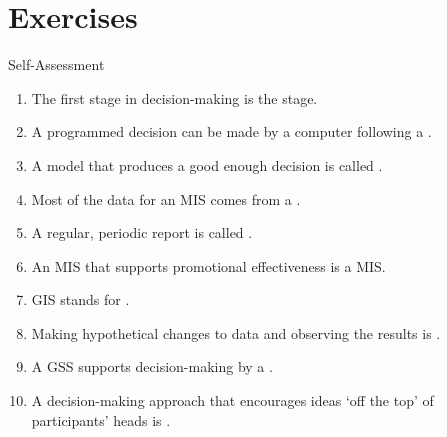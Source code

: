 \documentclass[\main/notes.tex]{subfiles}
\begin{document}
		\pagebreak
		\section{Exercises}
			\begin{exercise}{Self-Assessment}
				\begin{enumerate}[nosep]
					\item The first stage in decision-making is the  stage.
					\item A programmed decision can be made by a computer following a .
					\item A model that produces a good enough decision is called .
					\item Most of the data for an MIS comes from a .
					\item A regular, periodic report is called .
					\item An MIS that supports promotional effectiveness is a  MIS.
					\item GIS stands for .
					\item Making hypothetical changes to data and observing the results is .
					\item A GSS supports decision-making by a .
					\item A decision-making approach that encourages ideas `off the top' of participants' heads is .
				\end{enumerate}
			\end{exercise}

	\vbox{}
\end{document}
